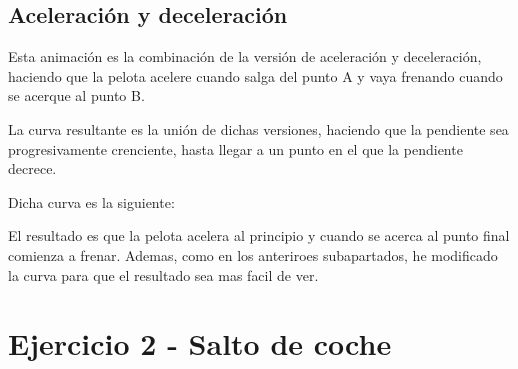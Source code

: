 \documentclass{article}
\begin{document}
\subsection{Aceleración y deceleración}

Esta animación es la combinación de la versión de aceleración y deceleración, haciendo que la pelota acelere cuando salga del punto A y vaya frenando cuando se acerque al punto B. 

La curva resultante es la unión de dichas versiones, haciendo que la pendiente sea progresivamente crenciente, hasta llegar a un punto en el que la pendiente decrece. 

Dicha curva es la siguiente:


El resultado es que la pelota acelera al principio y cuando se acerca al punto final comienza a frenar. Ademas, como en los anteriroes subapartados, he modificado la curva para que el resultado sea mas facil de ver.


\section{Ejercicio 2 - Salto de coche}
\end{document}
